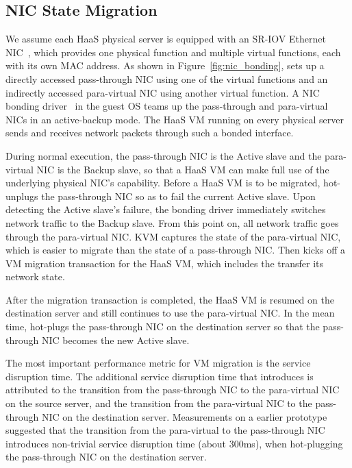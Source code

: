 \vspace{-0.1in}
\subsection{NIC State Migration}
\label{sec:nic_migration}
\vspace{-0.05in}

We assume each HaaS physical server is equipped with an SR-IOV Ethernet NIC~\cite{dong:2008},
which provides one physical function and multiple virtual functions, each with its own MAC address.
As shown in Figure~\ref{fig:nic_bonding},
\na sets up a directly accessed pass-through NIC using one of the virtual functions
and an indirectly accessed para-virtual NIC using another virtual function.
A NIC bonding driver~\cite{bond-dri} in the guest OS teams up the pass-through and para-virtual NICs in an active-backup mode.
The HaaS VM running on every \na physical server sends and receives network packets through such a bonded interface.

During normal execution, the pass-through NIC is the Active slave and the para-virtual NIC is the Backup slave,
so that a HaaS VM can make full use of the underlying physical NIC's capability.
Before a HaaS VM is to be migrated, \na hot-unplugs the pass-through NIC so as to fail the current Active slave.
Upon detecting the Active slave's failure, the bonding driver immediately switches network traffic to the Backup slave.
From this point on, all network traffic goes through the para-virtual NIC.
KVM captures the state of the para-virtual NIC, which is easier to migrate than the state of a pass-through NIC.
Then \na kicks off a VM migration transaction for the HaaS VM, which includes the transfer its network state.

After the migration transaction is completed, the HaaS VM is resumed on the destination server and still continues to use the para-virtual NIC.
In the mean time, \na hot-plugs the pass-through NIC on the destination  server
so that the pass-through NIC becomes the new Active slave.



The most important performance metric for VM migration is the service disruption time.
The additional service disruption time that \na introduces is attributed to the transition from
the pass-through NIC to the para-virtual NIC on the source server, and the transition from
the para-virtual NIC to the pass-through NIC on the destination server.
Measurements on a earlier \na prototype suggested that the transition from the
para-virtual to the pass-through NIC introduces non-trivial service disruption time (about 300ms),
when hot-plugging the pass-through NIC on the destination server.

